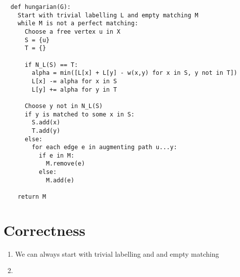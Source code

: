 \documentclass[12pt]{article}
\begin{document}
\begin{verbatim}
  def hungarian(G):
    Start with trivial labelling L and empty matching M
    while M is not a perfect matching:
      Choose a free vertex u in X
      S = {u}
      T = {}

      if N_L(S) == T:
        alpha = min([L[x] + L[y] - w(x,y) for x in S, y not in T])
        L[x] -= alpha for x in S
        L[y] += alpha for y in T

      Choose y not in N_L(S)
      if y is matched to some x in S:
        S.add(x)
        T.add(y)
      else:
        for each edge e in augmenting path u...y:
          if e in M:
            M.remove(e)
          else:
            M.add(e)

    return M
\end{verbatim}

\section*{Correctness}
\begin{enumerate}
  \item We can always start with trivial labelling and and empty matching
  \item
\end{enumerate}
\end{document}
